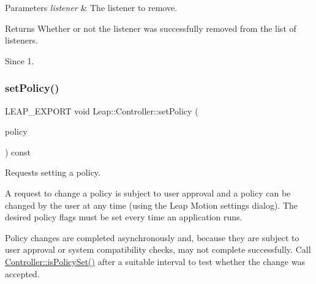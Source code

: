 \begin{DoxyCodeInclude}
\end{DoxyCodeInclude}



\begin{DoxyParams}{Parameters}
{\em listener} & The listener to remove. \\
\hline
\end{DoxyParams}
\begin{DoxyReturn}{Returns}
Whether or not the listener was successfully removed from the list of listeners. 
\end{DoxyReturn}
\begin{DoxySince}{Since}
1. 
\end{DoxySince}
\mbox{\label{class_leap_1_1_controller_a5854109f9466b9b2b4638592450160a9}} 
\subsubsection{\texorpdfstring{set\+Policy()}{setPolicy()}}
{\footnotesize\ttfamily L\+E\+A\+P\+\_\+\+E\+X\+P\+O\+RT void Leap\+::\+Controller\+::set\+Policy (\begin{DoxyParamCaption}\item[{\hyperlink{class_leap_1_1_controller_a0bdb49fa94aa2da8b098c1ac296528d6}{Policy\+Flag}}]{policy }\end{DoxyParamCaption}) const}

Requests setting a policy.

A request to change a policy is subject to user approval and a policy can be changed by the user at any time (using the Leap Motion settings dialog). The desired policy flags must be set every time an application runs.

Policy changes are completed asynchronously and, because they are subject to user approval or system compatibility checks, may not complete successfully. Call \hyperlink{class_leap_1_1_controller_a75bfba23a30619a3514fa1d654b4df29}{Controller\+::is\+Policy\+Set()} after a suitable interval to test whether the change was accepted.


\begin{DoxyCodeInclude}
\end{DoxyCodeInclude}



